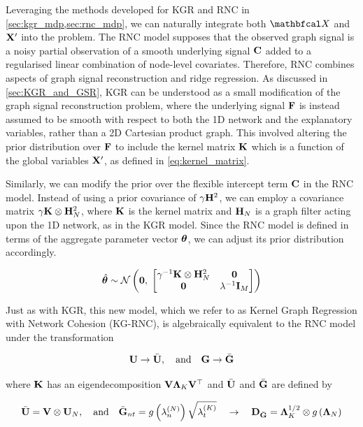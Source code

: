 Leveraging the methods developed for KGR and RNC in \cref{sec:kgr_mdp,sec:rnc_mdp}, we can naturally integrate both $\Xt$ and $\mathbf{X}'$ into the problem. The RNC model supposes that the observed graph signal is a noisy partial observation of a smooth underlying signal $\mathbf{C}$ added to a regularised linear combination of node-level covariates. Therefore, RNC combines aspects of graph signal reconstruction and ridge regression. As discussed in \cref{sec:KGR_and_GSR}, KGR can be understood as a small modification of the graph signal reconstruction problem, where the underlying signal $\mathbf{F}$ is instead assumed to be smooth with respect to both the 1D network and the explanatory variables, rather than a 2D Cartesian product graph. This involved altering the prior distribution over $\mathbf{F}$ to include the kernel matrix $\mathbf{K}$ which is a function of the global variables $\mathbf{X}'$, as defined in \cref{eq:kernel_matrix}. 

Similarly, we can modify the prior over the flexible intercept term $\mathbf{C}$ in the RNC model. Instead of using a prior covariance of $\gamma \mathbf{H}^2$, we can employ a covariance matrix $\gamma \mathbf{K} \otimes \mathbf{H}_N^2$, where $\mathbf{K}$ is the kernel matrix and $\mathbf{H}_N$ is a graph filter acting upon the 1D network, as in the KGR model. Since the RNC model is defined in terms of the aggregate parameter vector $\boldsymbol{\theta}$, we can adjust its prior distribution accordingly.

\begin{equation}
    \label{eq:theta_prior2}
    \hat{\boldsymbol{\theta}} \sim \mathcal{N}\left( \mathbf{0}, \; \begin{bmatrix} \gamma^{-1} \mathbf{K} \otimes \mathbf{H}_N^2 & \mathbf{0} \\ \mathbf{0} & \lambda^{-1} \mathbf{I}_M \end{bmatrix} \right)
\end{equation}

Just as with KGR, this new model, which we refer to as Kernel Graph Regression with Network Cohesion (KG-RNC), is algebraically equivalent to the RNC model under the transformation 

$$
\mathbf{U} \rightarrow \bar{\mathbf{U}}, \quad \text{and} \quad \mathbf{G} \rightarrow \bar{\mathbf{G}}
$$

where $\mathbf{K}$ has an eigendecomposition $\mathbf{V} \mathbf{\Lambda}_K \mathbf{V}^\top$ and $\bar{\mathbf{U}}$ and $\bar{\mathbf{G}}$ are defined by

$$
\bar{\mathbf{U}} = \mathbf{V} \otimes \mathbf{U}_N, \quad \text{and} \quad     \bar{\mathbf{G}}_{nt} = g\left(\lambda^{(N)}_n\right) \sqrt{\lambda^{(K)}_t} \quad \rightarrow \quad \mathbf{D}_{\bar{\mathbf{G}}} = \mathbf{\Lambda}_K^{1/2} \otimes g\left(\mathbf{\Lambda}_N\right) 
$$

